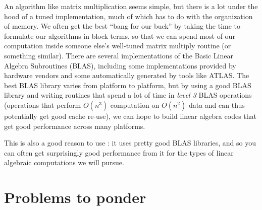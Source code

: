 \documentclass[12pt, leqno]{article}
\begin{document}
An algorithm like matrix multiplication seems simple, but there is a
lot under the hood of a tuned implementation, much of which has to do
with the organization of memory.  We often get the best ``bang for our
buck'' by taking the time to formulate our algorithms in block terms,
so that we can spend most of our computation inside someone else's
well-tuned matrix multiply routine (or something similar).  There are
several implementations of the Basic Linear Algebra Subroutines
(BLAS), including some implementations provided by hardware vendors
and some automatically generated by tools like ATLAS.  The best BLAS
library varies from platform to platform, but by using a good BLAS
library and writing routines that spend a lot of time in {\em level 3}
BLAS operations (operations that perform $O(n^3)$ computation on
$O(n^2)$ data and can thus potentially get good cache re-use), we can
hope to build linear algebra codes that get good performance across
many platforms.

This is also a good reason to use \matlab: it uses pretty good BLAS libraries,
and so you can often get surprisingly good performance from it for the types
of linear algebraic computations we will pursue.

\section*{Problems to ponder}
\end{document}
